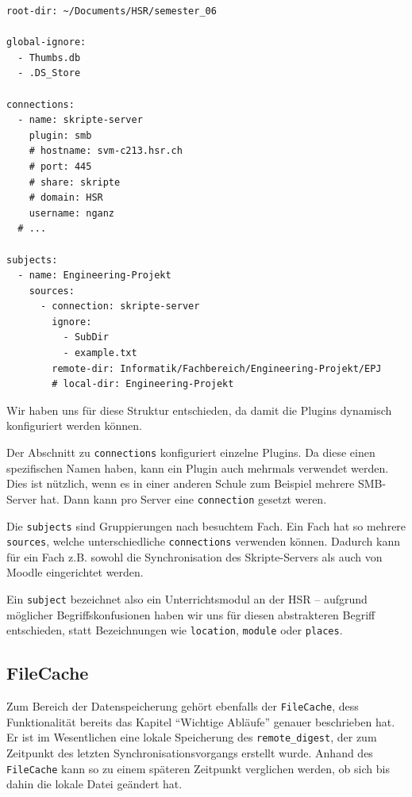 \documentclass[a4paper]{article}
\begin{document}
\begin{verbatim}
root-dir: ~/Documents/HSR/semester_06

global-ignore:
  - Thumbs.db
  - .DS_Store

connections:
  - name: skripte-server
    plugin: smb
    # hostname: svm-c213.hsr.ch
    # port: 445
    # share: skripte
    # domain: HSR
    username: nganz
  # ...

subjects:
  - name: Engineering-Projekt
    sources:
      - connection: skripte-server
        ignore:
          - SubDir
          - example.txt
        remote-dir: Informatik/Fachbereich/Engineering-Projekt/EPJ
        # local-dir: Engineering-Projekt
\end{verbatim}

Wir haben uns für diese Struktur entschieden, da damit die Plugins dynamisch konfiguriert werden können.

Der Abschnitt zu \verb|connections| konfiguriert einzelne Plugins.
Da diese einen spezifischen Namen haben, kann ein Plugin auch mehrmals verwendet werden.
Dies ist nützlich, wenn es in einer anderen Schule zum Beispiel mehrere SMB-Server hat.
Dann kann pro Server eine \verb|connection| gesetzt weren.

Die \verb|subjects| sind Gruppierungen nach besuchtem Fach.
Ein Fach hat so mehrere \verb|sources|, welche unterschiedliche \verb|connections| verwenden können.
Dadurch kann für ein Fach z.B. sowohl die Synchronisation des Skripte-Servers als auch von Moodle eingerichtet werden.

Ein \verb|subject| bezeichnet also ein Unterrichtsmodul an der HSR -- aufgrund möglicher Begriffskonfusionen haben wir uns für diesen abstrakteren Begriff entschieden, statt Bezeichnungen wie \verb|location|, \verb|module| oder \verb|places|.

\pagebreak

\subsection{FileCache}

Zum Bereich der Datenspeicherung gehört ebenfalls der \verb|FileCache|, dess Funktionalität bereits das Kapitel ``Wichtige Abläufe'' genauer beschrieben hat. Er ist im Wesentlichen eine lokale Speicherung des \verb|remote_digest|, der zum Zeitpunkt des letzten Synchronisationsvorgangs erstellt wurde. Anhand des \verb|FileCache| kann so zu einem späteren Zeitpunkt verglichen werden, ob sich bis dahin die lokale Datei geändert hat.
\end{document}
